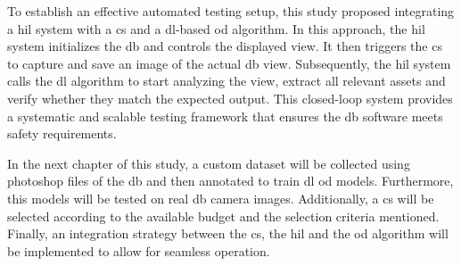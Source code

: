 To establish an effective automated testing setup, this study proposed integrating a \gls{hil} system with a \gls{cs} and a \gls{dl}-based \gls{od} algorithm. In this approach, the \gls{hil} system initializes the \gls{db} and controls the displayed view. It then triggers the \gls{cs} to capture and save an image of the actual \gls{db} view. Subsequently, the \gls{hil} system calls the \gls{dl} algorithm to start analyzing the view, extract all relevant assets and verify whether they match the expected output. This closed-loop system provides a systematic and scalable testing framework that ensures the \gls{db} software meets safety requirements.

In the next chapter of this study, a custom dataset will be collected using photoshop files of the \gls{db} and then annotated to train \gls{dl} \gls{od} models. Furthermore, this models will be tested on real \gls{db} camera images. Additionally, a \gls{cs} will be selected according to the available budget and the selection criteria mentioned. Finally, an integration strategy between the \gls{cs}, the \gls{hil} and the \gls{od} algorithm will be implemented to allow for seamless operation.

